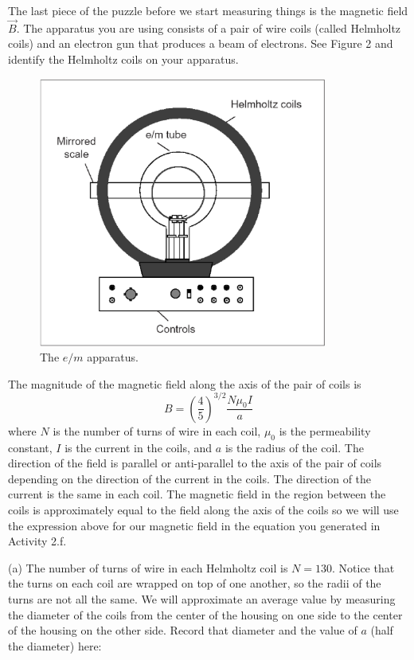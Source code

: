 The last piece of the puzzle before we start measuring things is the magnetic 
field $\vec B$. The apparatus you are using consists of a pair of wire coils 
(called Helmholtz coils) and an electron gun that produces a beam of electrons.
See Figure 2 and identify the Helmholtz coils on your apparatus.
\begin{figure}[hbt]
\begin{center}

\includegraphics[height=3.5in]{eoverm/apparatus1.eps}

\caption{The $e/m$ apparatus.}

\end{center}
\end{figure}
The magnitude of the magnetic field along the axis of the pair of coils is
\begin{equation}
B = \left ( \frac{4}{5} \right )^{3/2} \frac{N \mu_0 I}{a}
\end{equation}
where $N$ is the number of turns of wire in each coil, $\mu_0$
is the permeability constant,  $I$ is the current in the coils,
and $a$ is the radius of the coil.
The direction of the field is parallel or anti-parallel
to the axis of the pair of coils depending on the direction of the current
in the coils.
The direction of the current is the same in each coil.
The magnetic field in the region between the coils is approximately equal
to the field along the axis of the coils so we will use
the expression above for our magnetic field in the equation you generated in
Activity 2.f.

\newpage

(a) The number of turns of wire in each Helmholtz coil is $N=130$. Notice that 
the turns on each coil are wrapped on top of one another, so the radii of the 
turns are not all the same. We will approximate an average value by measuring 
the diameter of the coils from the center of the housing on one side to the 
center of the housing on the other side. Record that diameter and the value of 
$a$ (half the diameter) here:
\vspace{15mm}


